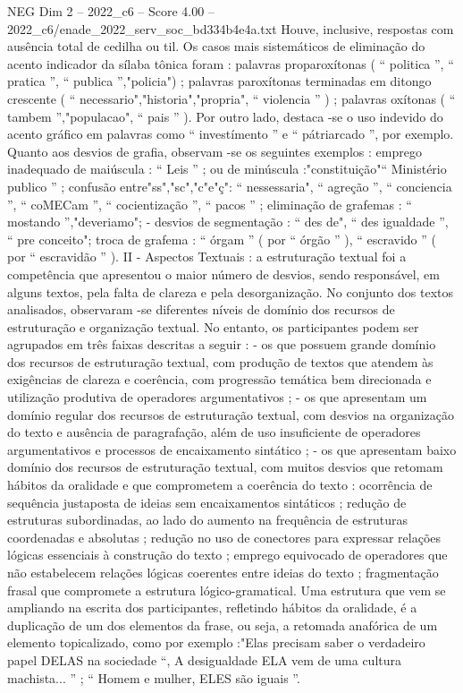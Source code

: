 \begin{textsample}{NEG Dim 2 – 2022\_c6 – Score 4.00 – 2022\_c6/enade\_2022\_serv\_soc\_bd334b4e4a.txt}
Houve, inclusive, respostas com ausência total de cedilha ou til.
Os casos mais sistemáticos de eliminação do acento indicador da sílaba tônica foram : palavras proparoxítonas ( “ politica ”, “ pratica ”, “ publica ”,"policia") ; palavras paroxítonas terminadas em ditongo crescente ( “ necessario","historia","propria", “ violencia ” ) ; palavras oxítonas ( “ tambem ”,"populacao", “ pais ” ).
Por outro lado, destaca -se o uso indevido do acento gráfico em palavras como “ investímento ” e “ pátriarcado ”, por exemplo.
Quanto aos desvios de grafia, observam -se os seguintes exemplos : emprego inadequado de maiúscula : “ Leis ” ; ou de minúscula :"constituição"“ Ministério publico ” ; confusão entre"ss","sc","c"e"ç": “ nessessaria", “ agreção ”, “ conciencia ”, “ coMECam ”, “ cocientização ”, “ pacos ” ; eliminação de grafemas : “ mostando ”,"deveriamo"; - desvios de segmentação : “ des de", “ des igualdade ”, “ pre conceito"; troca de grafema : “ órgam ” ( por “ órgão ” ), “ escravido ” ( por “ escravidão ” ).
II - Aspectos Textuais : a estruturação textual foi a competência que apresentou o maior número de desvios, sendo responsável, em alguns textos, pela falta de clareza e pela desorganização.
No conjunto dos textos analisados, observaram -se diferentes níveis de domínio dos recursos de estruturação e organização textual.
No entanto, os participantes podem ser agrupados em três faixas descritas a seguir : - os que possuem grande domínio dos recursos de estruturação textual, com produção de textos que atendem às exigências de clareza e coerência, com progressão temática bem direcionada e utilização produtiva de operadores argumentativos ; - os que apresentam um domínio regular dos recursos de estruturação textual, com desvios na organização do texto e ausência de paragrafação, além de uso insuficiente de operadores argumentativos e processos de encaixamento sintático ; - os que apresentam baixo domínio dos recursos de estruturação textual, com muitos desvios que retomam hábitos da oralidade e que comprometem a coerência do texto : ocorrência de sequência justaposta de ideias sem encaixamentos sintáticos ; redução de estruturas subordinadas, ao lado do aumento na frequência de estruturas coordenadas e absolutas ; redução no uso de conectores para expressar relações lógicas essenciais à construção do texto ; emprego equivocado de operadores que não estabelecem relações lógicas coerentes entre ideias do texto ; fragmentação frasal que compromete a estrutura lógico-gramatical.
Uma estrutura que vem se ampliando na escrita dos participantes, refletindo hábitos da oralidade, é a duplicação de um dos elementos da frase, ou seja, a retomada anafórica de um elemento topicalizado, como por exemplo :"Elas precisam saber o verdadeiro papel DELAS na sociedade “, A desigualdade ELA vem de uma cultura machista... ” ; “ Homem e mulher, ELES são iguais ”.

\end{textsample}

